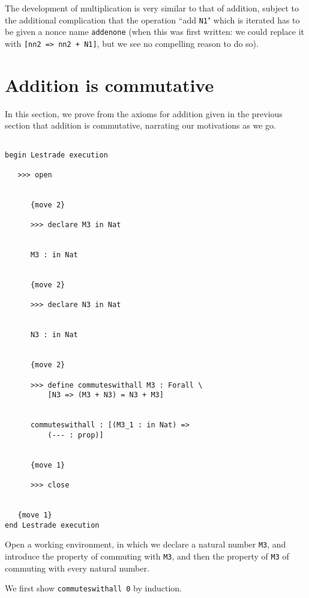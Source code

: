 \documentclass[12pt]{article}
\begin{document}
The development of multiplication is very similar to that of addition, subject to the additional complication that the operation ``add {\tt N1}" which is iterated has to be given
a nonce name {\tt addenone} (when this was first written:  we could replace it with {\tt [nn2 => nn2 + N1]}, but we see no compelling reason to do so).

\section{Addition is commutative}

In this section, we prove from the axioms for addition given in the previous section that addition is commutative, narrating our motivations
as we go.



\begin{verbatim}

begin Lestrade execution

   >>> open


      {move 2}

      >>> declare M3 in Nat


      M3 : in Nat


      {move 2}

      >>> declare N3 in Nat


      N3 : in Nat


      {move 2}

      >>> define commuteswithall M3 : Forall \
          [N3 => (M3 + N3) = N3 + M3]


      commuteswithall : [(M3_1 : in Nat) => 
          (--- : prop)]


      {move 1}

      >>> close


   {move 1}
end Lestrade execution
\end{verbatim}

Open a working environment, in which we declare a natural number {\tt M3}, and introduce the property of commuting with {\tt M3}, and then the property of {\tt M3} of commuting with every natural number.

We first show {\tt commuteswithall 0} by induction.
\end{document}
